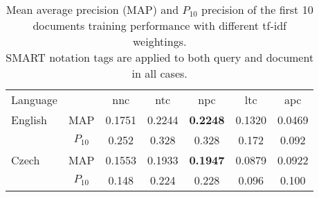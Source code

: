 \documentclass[a4paper]{article}
\begin{document}
\begin{table}[htpb]
	\centering
	\caption{Mean average precision (MAP) and $P_{10}$ precision of the first
		10 documents training performance with different tf-idf weightings.\\
	SMART notation tags are applied to both query and document in all cases.\\}
	\label{tab:tfidf}
	\begin{tabular}{@{}l|cccccc@{}}
		\toprule
		Language & & nnc & ntc & npc & ltc & apc \\
		\cmidrule(r){1-1}\cmidrule(lr){2-2}\cmidrule(lr){3-3}\cmidrule(lr){4-4}\cmidrule(lr){5-5}\cmidrule(lr){6-6}\cmidrule(l){7-7}
		English & MAP & 0.1751 & 0.2244 & \textbf{0.2248} & 0.1320 & 0.0469 \\
				& \small{$P_{10}$} & \small{0.252} & \small{0.328} & \small{0.328} & \small{0.172} & \small{0.092} \\
		\cmidrule(r){1-1}\cmidrule(lr){2-2}\cmidrule(lr){3-3}\cmidrule(lr){4-4}\cmidrule(lr){5-5}\cmidrule(lr){6-6}\cmidrule(l){7-7}
		Czech & MAP & 0.1553 & 0.1933 & \textbf{0.1947} & 0.0879 & 0.0922 \\
		& \small{$P_{10}$} & \small{0.148} & \small{0.224} & \small{0.228} & \small{0.096} & \small{0.100} \\
		\bottomrule
	\end{tabular}
\end{table}
\end{document}
